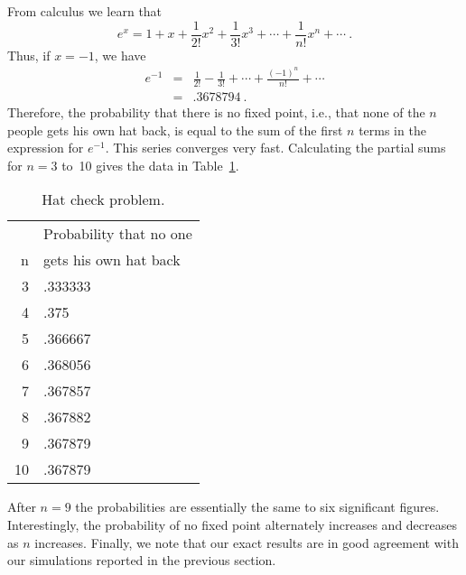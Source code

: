 \begin{example}
From calculus we learn that
$$ e^x = 1 + x + \frac 1{2!}x^2 + \frac 1{3!}x^3 + \cdots + \frac 1{n!}x^n + \cdots\ .
$$ Thus, if $x = -1$, we have
\begin{eqnarray*} e^{-1} & = &\frac 1{2!} - \frac 1{3!} + \cdots + \frac{(-1)^n}{n!} +
\cdots \\
       & = & .3678794\ .
\end{eqnarray*} Therefore, the probability that there is no fixed point, i.e., that
none of the $n$ people gets his own hat back, is equal to the sum of the first $n$
terms in the expression for $e^{-1}$.  This series converges very fast.  Calculating
the partial sums for $n = 3$ to~10 gives the data in Table~\ref{table 3.7}.
\begin{table}
\centering
\begin{tabular}{rl}
      &        Probability that no one  \\
   n  &        gets his own hat back    \\\hline
   3  &       \hspace{.25in}.333333     \\
   4  &       \hspace{.2in} .375        \\
   5  &       \hspace{.25in}.366667     \\
   6  &       \hspace{.25in}.368056     \\
   7  &       \hspace{.25in}.367857     \\
   8  &       \hspace{.25in}.367882     \\
   9  &       \hspace{.25in}.367879     \\
  10  &       \hspace{.25in}.367879     \\\hline
\end{tabular}
\caption{Hat check problem.}
\label{table 3.7}
\end{table}
\par
After $n = 9$ the probabilities are essentially the same to six significant figures. 
Interestingly, the probability of no fixed point alternately increases and decreases
as $n$ increases.  Finally, we note that our exact results are in good agreement with
our simulations reported in the previous section.
\end{example}

